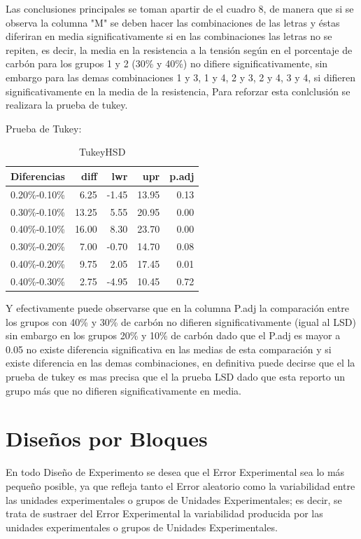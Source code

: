 \documentclass[12pt,letterpaper]{report}
\begin{document}
Las conclusiones principales se toman apartir de el cuadro 8, de manera que si se observa la columna "M" se deben hacer las combinaciones de las letras y éstas diferiran en media significativamente si en las combinaciones las letras no se repiten, es decir, la media en la resistencia a la tensión según en el porcentaje de carbón para los grupos 1 y 2 (30\% y 40\%) no difiere significativamente, sin embargo para las demas combinaciones 1 y 3, 1 y 4, 2 y 3, 2 y 4, 3 y 4, si difieren significativamente en la media de la resistencia, Para reforzar esta conlclusión se realizara la prueba de tukey.


Prueba de Tukey: 
\begin{Schunk}
\end{Schunk}

\begin{table}[ht]
\centering
\begin{tabular}{rrrrr}
  \hline
 Diferencias  & diff & lwr & upr & p.adj \\ 
  \hline
0.20\%-0.10\% & 6.25 & -1.45 & 13.95 & 0.13 \\ 
  0.30\%-0.10\% & 13.25 & 5.55 & 20.95 & 0.00 \\ 
  0.40\%-0.10\% & 16.00 & 8.30 & 23.70 & 0.00 \\ 
  0.30\%-0.20\% & 7.00 & -0.70 & 14.70 & 0.08 \\ 
  0.40\%-0.20\% & 9.75 & 2.05 & 17.45 & 0.01 \\ 
  0.40\%-0.30\% & 2.75 & -4.95 & 10.45 & 0.72 \\ 
   \hline
\end{tabular}
\caption{TukeyHSD}
\end{table}

Y efectivamente puede observarse que en la columna P.adj la comparación entre los grupos con 40\% y 30\% de carbón no difieren significativamente (igual al LSD) sin embargo en los grupos 20\% y 10\% de carbón  dado que el P.adj es mayor a 0.05 no existe diferencia significativa en las medias de esta comparación y si existe diferencia en las demas combinaciones, en definitiva puede decirse que el la prueba de tukey es mas precisa que el la prueba LSD dado que esta reporto un grupo más que no difieren significativamente en media.
\newpage
\chapter*{Diseños por Bloques}
En todo Diseño de Experimento se desea que el Error Experimental sea lo más pequeño
posible, ya que refleja tanto el Error aleatorio como la variabilidad entre las unidades
experimentales o grupos de Unidades Experimentales; es decir, se trata de sustraer del Error
Experimental la variabilidad producida por las unidades experimentales o grupos de Unidades
Experimentales.
\end{document}
